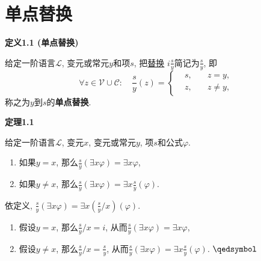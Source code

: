 \documentclass[UTF8]{ctexart}
\begin{document}
\setlength{\abovedisplayskip}{1pt}
\setlength{\belowdisplayskip}{1pt}

\section{单点替换}

\hypertarget{sec:定义1.1}{}
\noindent\textbf{定义1.1 (单点替换)}

给定一阶语言$\mathcal{L}$, 变元或常元$y$和项$s$,
把\href{04 一般替换#nameddest=sec:定义1.1}{替换}
$\displaystyle i\frac{s}{y}$简记为$\displaystyle\frac{s}{y}$, 即
\[\forall z\in\mathcal{V}\cup\mathcal{C}:\quad\frac{s}{y}(z)=
\left\{\begin{aligned}
    &s,\quad&z=y,\\[-3pt]
    &z,\quad&z\neq y,
\end{aligned}\right.\]
称之为$y$到$s$的\textbf{单点替换}.

\vspace{10pt}

\hypertarget{sec:定理1.1}{}
\noindent\textbf{定理1.1}

给定一阶语言$\mathcal{L}$, 变元$x$, 变元或常元$y$, 项$s$和公式$\varphi$.
\vspace{3pt}
\begin{enumerate}
    \item 如果$y=x$, 那么$\displaystyle
    \frac{s}{y}(\exists x\varphi)=\exists x\varphi$,
    \vspace{6pt}
    \item 如果$y\neq x$, 那么$\displaystyle
    \frac{s}{y}(\exists x\varphi)=\exists x\frac{s}{y}(\varphi)$.
\end{enumerate}


依定义, $\displaystyle\frac{s}{y}(\exists x\varphi)=
\exists x\left(\frac{s}{y}/x\right)(\varphi)$.

\vspace{3pt}
\begin{enumerate}
    \item 假设$y=x$, 那么$\displaystyle\frac{s}{y}/x=i$,
    从而$\displaystyle\frac{s}{y}(\exists x\varphi)=\exists x\varphi$,
    \vspace{6pt}
    \item 假设$y\neq x$, 那么$\displaystyle\frac{s}{y}/x=\frac{s}{y}$,
    从而$\displaystyle\frac{s}{y}(\exists x\varphi)=\exists x\frac{s}{y}(\varphi)$.
    \hfill $\qedsymbol$
\end{enumerate}
\end{document}
